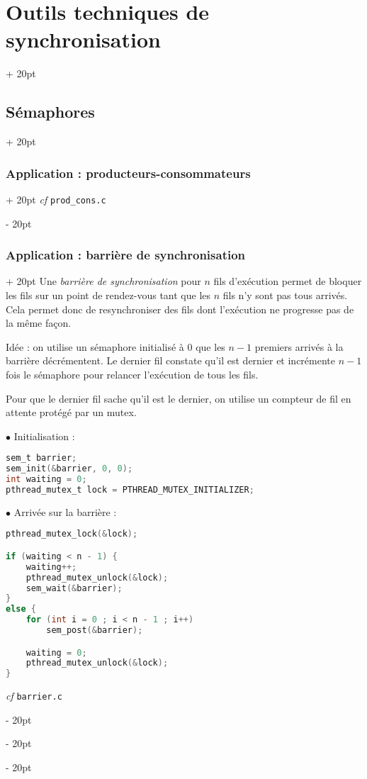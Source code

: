 \documentclass[a4paper, 12pt, twoside]{article}
\newcommand{\ind}[1][20pt]{\advance\leftskip + #1}
\newcommand{\deind}[1][20pt]{\advance\leftskip - #1}
\newenvironment{indt}[2][20pt]{#2 \par \ind[#1]}{\par \deind} %
\begin{document}
\begin{indt}{\section{Outils techniques de synchronisation}}
\begin{indt}{\subsection{Sémaphores}}
\begin{indt}{\subsubsection{Application : producteurs-consommateurs}}
                \textit{cf} \texttt{prod\_cons.c}
            \end{indt}

            \vspace{12pt}
            
            \begin{indt}{\subsubsection{Application : barrière de synchronisation}}
                Une \emph{barrière de synchronisation} pour $n$ fils d'exécution permet de bloquer les fils sur un point de rendez-vous tant que les $n$ fils n'y sont pas tous arrivés.
                Cela permet donc de resynchroniser des fils dont l'exécution ne progresse pas de la même façon.

                Idée : on utilise un sémaphore initialisé à 0 que les $n - 1$ premiers arrivés à la barrière décrémentent. Le dernier fil constate qu'il est dernier et incrémente $n - 1$ fois le sémaphore pour relancer l'exécution de tous les fils.

                Pour que le dernier fil sache qu'il est le dernier, on utilise un compteur de fil en attente protégé par un mutex.

                \vspace{12pt}
                
                $\bullet$ Initialisation :
                \begin{lstlisting}[language=C, xleftmargin=80pt]
sem_t barrier;
sem_init(&barrier, 0, 0);
int waiting = 0;
pthread_mutex_t lock = PTHREAD_MUTEX_INITIALIZER;\end{lstlisting}

                $\bullet$ Arrivée sur la barrière :
                \begin{lstlisting}[language=C, xleftmargin=80pt]
pthread_mutex_lock(&lock);

if (waiting < n - 1) {
    waiting++;
    pthread_mutex_unlock(&lock);
    sem_wait(&barrier);
}
else {
    for (int i = 0 ; i < n - 1 ; i++)
        sem_post(&barrier);

    waiting = 0;
    pthread_mutex_unlock(&lock);
}\end{lstlisting}

                \textit{cf} \texttt{barrier.c}
            \end{indt}
        \end{indt}
    \end{indt}
    
    
    
\end{document}
